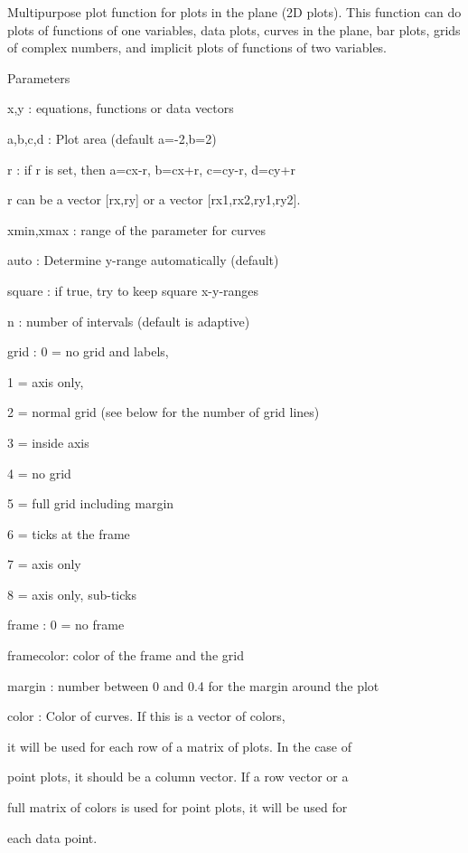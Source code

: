 \documentclass{article}
\begin{document}
Multipurpose plot function for plots in the plane (2D plots). This function can do
plots of functions of one variables, data plots, curves in the plane, bar plots, grids
of complex numbers, and implicit plots of functions of two variables.


Parameters




x,y       : equations, functions or data vectors


a,b,c,d   : Plot area (default a=-2,b=2)


r         : if r is set, then a=cx-r, b=cx+r, c=cy-r, d=cy+r


            r can be a vector [rx,ry] or a vector [rx1,rx2,ry1,ry2].


xmin,xmax : range of the parameter for curves


auto      : Determine y-range automatically (default)


square    : if true, try to keep square x-y-ranges


n         : number of intervals (default is adaptive)


grid      : 0 = no grid and labels,


            1 = axis only,


            2 = normal grid (see below for the number of grid lines)


            3 = inside axis


            4 = no grid


            5 = full grid including margin


            6 = ticks at the frame


            7 = axis only


            8 = axis only, sub-ticks


frame     : 0 = no frame


framecolor: color of the frame and the grid


margin    : number between 0 and 0.4 for the margin around the plot


color     : Color of curves. If this is a vector of colors,


            it will be used for each row of a matrix of plots. In the case of


            point plots, it should be a column vector. If a row vector or a


            full matrix of colors is used for point plots, it will be used for


            each data point.
\end{document}

